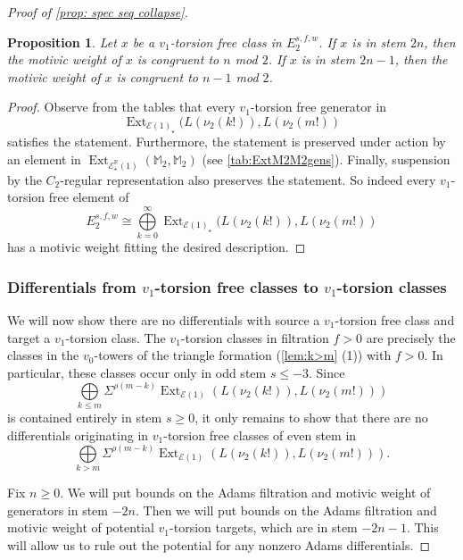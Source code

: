 \documentclass{amsart}
\newtheorem{proposition}[equation]{Proposition}
\theoremstyle{plain}
\numberwithin{equation}{section}
\numberwithin{figure}{section}
\DeclareMathOperator{\Ext}{Ext}
\newcommand{\mM}{{\mathbb M}}
\newcommand{\mR}{{\mathbb R}}
\newcommand{\cE}{{\mathcal E}}
\newcommand{\0}{\langle 0 \rangle }
\begin{document}
\begin{proof}[Proof of \cref{prop: spec seq collapse}]
\begin{proposition}
    Let $x$ be a $v_{1}$-torsion free class in $E_{2}^{s,f,w}$. If $x$ is in stem $2n$, then the motivic weight of $x$ is congruent to $n$ mod $2$. If $x$ is in stem $2n-1$, then the motivic weight of $x$ is congruent to $n-1$ mod $2$. 
\end{proposition}
\begin{proof}
    Observe from the tables that every $v_{1}$-torsion free generator in
    \[
    \Ext_{\cE(1)_{\star}}(L(\nu_{2}(k!)), L(\nu_{2}(m!))
    \]
    satisfies the statement. Furthermore, the statement is preserved under action by an element in $\Ext_{\cE^{\mR}_\star(1)}(\mM_{2}, \mM_{2})$ (see \cref{tab:ExtM2M2gens}). Finally, suspension by the $C_2$-regular representation also preserves the statement. So indeed every $v_{1}$-torsion free element of 
    \[
    E_{2}^{s,f,w} \cong \bigoplus\limits_{k=0}^{\infty}\Ext_{\cE(1)_{\star}}(L(\nu_{2}(k!)), L(\nu_{2}(m!))
    \]
    has a motivic weight fitting the desired description.
\end{proof}

\subsubsection{Differentials from $v_{1}$-torsion free classes to $v_{1}$-torsion classes}
We will now show there are no differentials with source a $v_1$-torsion free class and target a $v_{1}$-torsion class. The $v_1$-torsion classes in filtration $f > 0$ are precisely the classes in the $v_0$-towers of the triangle formation (\cref{lem:k>m} (1)) with $f >0$. In particular, these classes occur only in odd stem $s \leq -3$. Since 
\[
\bigoplus\limits_{k \le m}\Sigma^{\rho(m-k)}\Ext_{\cE(1)}( L(\nu_{2}(k!) ), L(\nu_{2}(m!) ) )
\]
is contained entirely in stem $s \ge 0$, it only remains to show that there are no differentials originating in $v_1$-torsion free classes of even stem in 
\[
\bigoplus\limits_{k > m}\Sigma^{\rho(m-k)}\Ext_{\cE(1)}( L(\nu_{2}(k!) ), L(\nu_{2}(m!) ) )
.\]


Fix $n \ge 0$. We will put bounds on the Adams filtration and motivic weight of generators in stem $-2n$. Then we will put bounds on the Adams filtration and motivic weight of potential $v_1$-torsion targets, which are in stem $-2n-1$. This will allow us to rule out the potential for any nonzero Adams differentials. 


\end{proof}
\end{document}
